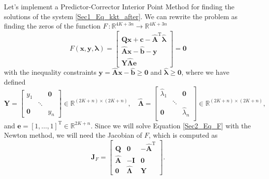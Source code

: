 Let's implement a Predictor-Corrector Interior Point Method for finding the solutions of the system \eqref{Sec1_Eq_kkt_after}. We can rewrite the problem as finding the zeros of the function \(F\,: \mathbb{R}^{4K + 3n} \to \mathbb{R}^{4K + 3n}\)
\begin{equation}
    F(\bm{x}, \bm{y} ,\bm{\lambda}) = \begin{bmatrix}
                        \mathbf{Q}\bm{x} + \bm{c} - \hat{\mathbf{A}}^\mathrm{T}\hat{\bm{\lambda}}\\
                        \hat{\mathbf{A}}\bm{x} - \hat{\bm{b}} - \bm{y}\\
                        \mathbf{Y}\hat{\mathbf{\Lambda}}\bm{e}
                    \end{bmatrix} = \bm{0}
                    \label{Sec2_Eq_F}
    \end{equation}
    with the inequality constraints $\bm{y} = \hat{\mathbf{A}}\bm{x} - \hat{\bm{b}} \geq \bm{0}$ and $\hat{\bm{\lambda}} \geq \bm{0}$, where we have defined
    \[\mathbf{Y} = 	\begin{bmatrix}
            y_1 & & \bm{0}\\
            & \ddots & \\
            \bm{0} && y_n
            \end{bmatrix} \in\mathbb{R}^{(2K+n) \times (2K+n) }, \quad  
            \hat{\mathbf{\Lambda}} = 	
            \begin{bmatrix}
            \hat{\lambda}_1 && \bm{0}\\
            & \ddots & \\
            \bm{0} & & \hat{\lambda}_n \\
            \end{bmatrix} \in\mathbb{R}^{(2K+n)\times (2K+n)},\]
    and $\bm{e} = [1, \dots, 1]^\mathrm{T} \in \mathbb{R}^{2K+n}$. Since we will solve Equation \eqref{Sec2_Eq_F} with the Newton method, we will need the Jacobian of \(F\), which is computed as
    \[ \mathbf{J}_F = \begin{bmatrix}
        \mathbf{Q} & \mathbf{0} & -\hat{\mathbf{A}}^\mathrm{T}\\
        \hat{\mathbf{A}} & -\mathbf{I} & \mathbf{0} \\
        \mathbf{0} & \hat{\mathbf{\Lambda}} &\mathbf{Y}
        \end{bmatrix}.\]